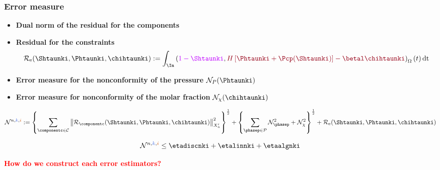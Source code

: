 \documentclass[aspectratio=169]{beamer}
\newcommand{\kk}{\textcolor{royalblue}{k}}
\newcommand{\ii}{\textcolor{burntorange}{i}}
\begin{document}
\begin{frame}
\frametitle{Error measure}
\vspace{-0.3 cm}
\begin{itemize}
\item 
\textcolor{cadmiumgreen}{\textbf{Dual norm of the residual for the components}}
\pause
\item
\textcolor{cadmiumgreen}{\textbf{Residual for the constraints}}
\begin{equation*}
  \mathcal{R}_{\mathrm{e}}(\Shtaunki,\Phtaunki,\chihtaunki) \egaldef \int_{\In}\left(\textcolor{electricpurple}{1 - \Shtaunki}, \textcolor{carmine}{H \left[\Phtaunki + \Pcp(\Shtaunki)\right] - \betal \chihtaunki} \right)_{\Omega}(t)\,\mathrm{dt}
\end{equation*}
\pause
\item
\textcolor{cadmiumgreen}{\textbf{Error measure for the nonconformity of the pressure}} $\mathcal{N}_{P}(\Phtaunki)$
\pause
\item \textcolor{cadmiumgreen}{\textbf{Error measure for nonconformity of the molar fraction}} $\mathcal{N}_{\chi}(\chihtaunki)$
\end{itemize}
\begin{equation*}
\mathcal{N}^{n,\kk,\ii}  \egaldef \left\{\sum_{\componentc \in\mathcal{C}} \left\|\mathcal{R}_{\componentc}(\Shtaunki,\Phtaunki,\chihtaunki) \right\|_{X_n'}^2 \right\}^{\frac{1}{2}} + \left\{\sum_{\phasep \in \mathcal{P}}\mathcal{N}_{\phasep}^2 + \mathcal{N}_{\chi}^2\right\}^{\frac{1}{2}} + \mathcal{R}_{\mathrm{e}}(\Shtaunki,\Phtaunki,\chihtaunki)
\end{equation*}
\begin{theorem}
\begin{equation*}
\mathcal{N}^{n,\kk,\ii} \leq \etadiscnki + \etalinnki + \etaalgnki
\end{equation*} 
\end{theorem}
\textcolor{red}{\textbf{How do we construct each error estimators?}}
\end{frame}
%
\end{document}
